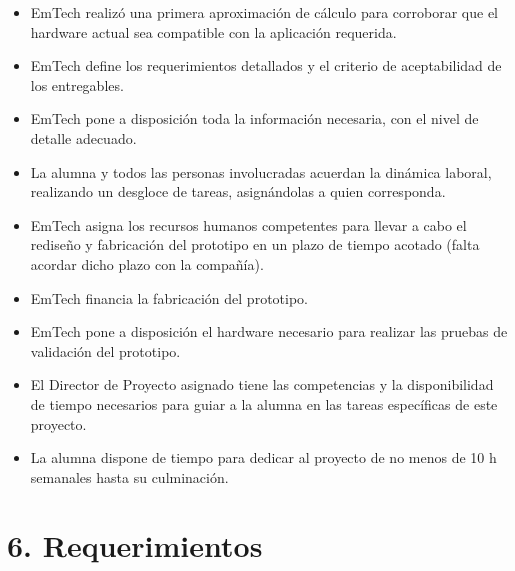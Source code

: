 \documentclass[
11pt, %
]{charter}
\begin{document}
\begin{itemize}
	\item EmTech realizó una primera aproximación de cálculo para corroborar que el hardware actual sea compatible con la aplicación requerida.
	\item EmTech define los requerimientos detallados y el criterio de aceptabilidad de los entregables.
	\item EmTech pone a disposición toda la información necesaria, con el nivel de detalle adecuado.
	\item La alumna y todos las personas involucradas acuerdan la dinámica laboral, realizando un desgloce de tareas, asignándolas a quien corresponda. 
	\item EmTech asigna los recursos humanos competentes para llevar a cabo el rediseño y fabricación del prototipo en un plazo de tiempo acotado (falta acordar dicho plazo con la compañía).
	\item EmTech financia la fabricación del prototipo.
	\item EmTech pone a disposición el hardware necesario para realizar las pruebas de validación del prototipo.
	\item El Director de Proyecto asignado tiene las competencias y la disponibilidad de tiempo necesarios para guiar a la alumna en las tareas específicas de este proyecto. 
	\item La alumna dispone de tiempo para dedicar al proyecto de no menos de 10 h semanales hasta su culminación.
	
\end{itemize}


\section{6. Requerimientos}
\label{sec:requerimientos}
\end{document}
